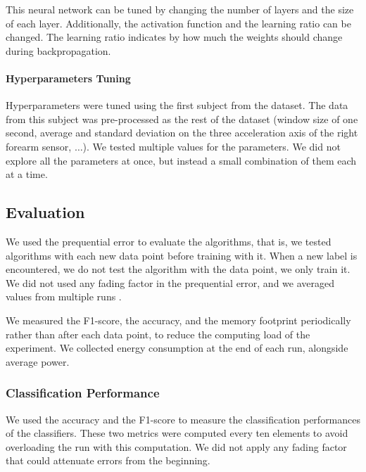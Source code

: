 This neural network can be tuned by changing the
number of layers and the size of each layer.
Additionally, the activation function and the
learning ratio can be changed. The learning ratio
indicates by how much the weights should change
during backpropagation.

\paragraph{Hyperparameters Tuning}
Hyperparameters were tuned using the first
subject from the \banosdataset dataset.  The data from
this subject was pre-processed as the rest of
the \banosdataset dataset (window size of one second,
average and standard deviation on the three
acceleration axis of the right forearm sensor,
$\ldots$). We tested multiple values for the
parameters.  We did
not explore all the parameters at once, but
instead a small combination of them each at a
time. 

\subsection{Evaluation}
We used the prequential error to evaluate the algorithms, that is, we tested
algorithms with each new data point before training with it. When a
new label is encountered, we do  not test the algorithm with the data point, we
only train it. We did not used any fading factor in the prequential error, and we averaged
values from multiple runs .

We measured the F1-score, the accuracy, and the memory footprint periodically
rather than after each data point, to reduce the computing load of the experiment.
We collected energy consumption at the end of each run, alongside average power.

\subsubsection{Classification Performance}
We used the accuracy and the F1-score to measure the classification
performances of the classifiers. These two metrics were computed every ten
elements to avoid overloading the run with this computation. We did not apply
any fading factor that could attenuate errors from the beginning.

